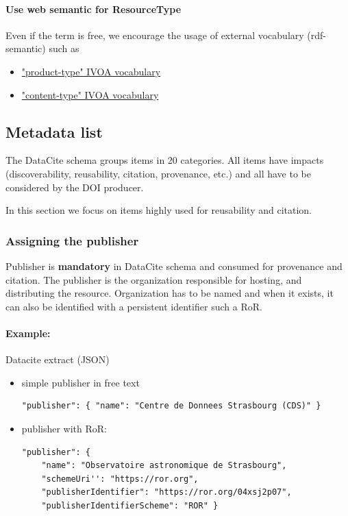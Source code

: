 \documentclass[11pt,a4paper]{ivoa}
\begin{document}

\paragraph{Use web semantic for ResourceType}
Even if the term is free, we encourage the usage of external vocabulary (rdf-semantic) such as

\begin{itemize}
\item \href{https://www.ivoa.net/rdf/product-type/}{"product-type"  IVOA vocabulary}
\item{} \href{https://ivoa.net/rdf/voresource/content_type/}{"content-type"  IVOA vocabulary}
\end{itemize}

\subsection{Metadata list}\hypertarget{metadata-list}{}\label{sec:metadata-list}

The DataCite schema groups items in 20 categories.  All items have impacts (discoverability, reusability, citation, provenance, etc.)  and all have to be considered by the DOI producer.

In this section we focus on items highly used for reusability and citation.

\subsubsection{Assigning the publisher}\hypertarget{assigning-the-publisher}{}\label{sec:assigning-the-publisher}

Publisher is \textbf{mandatory} in DataCite schema and consumed for provenance and citation. The publisher is the organization responsible for hosting, and distributing the resource. Organization has to be named and when it exists, it can also be identified with a persistent identifier such a RoR.

\paragraph{Example:} Datacite extract (JSON)

\begin{itemize}
\item{} simple publisher in free text

\begin{lstlisting}
"publisher": { "name": "Centre de Donnees Strasbourg (CDS)" }
\end{lstlisting}

\item{} publisher with RoR:

\begin{lstlisting}
"publisher": {
    "name": "Observatoire astronomique de Strasbourg",
    "schemeUri'': "https://ror.org",
    "publisherIdentifier": "https://ror.org/04xsj2p07",
    "publisherIdentifierScheme": "ROR" }
\end{lstlisting}
\end{itemize}
\end{document}
